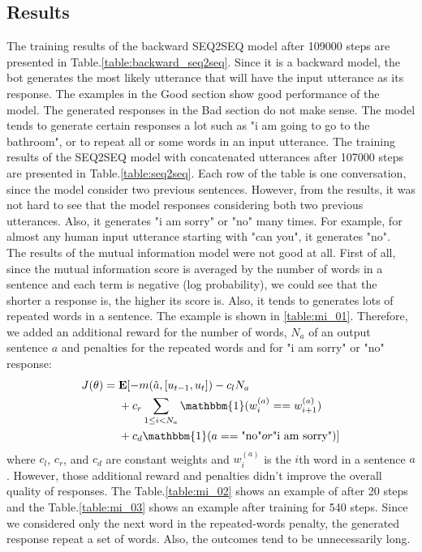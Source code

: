 \documentclass[letterpaper]{article}
\begin{document}
\subsection{Results}
The training results of the backward SEQ2SEQ model after 109000 steps are presented in Table.\ref{table:backward_seq2seq}. Since it is a backward model, the bot generates the most likely utterance that will have the input utterance as its response. The examples in the Good section show good performance of the model. The generated responses in the Bad section do not make sense. The model tends to generate certain responses a lot such as "i am going to go to the bathroom", or to repeat all or some words in an input utterance. The training results of the SEQ2SEQ model with concatenated utterances after 107000 steps are presented in Table.\ref{table:seq2seq}. Each row of the table is one conversation, since the model consider two previous sentences. However, from the results, it was not hard to see that the model responses considering both two previous utterances. Also, it generates "i am sorry" or "no" many times. For example, for almost any human input utterance starting with "can you", it generates "no". \\
The results of the mutual information model were not good at all. First of all, since the mutual information score is averaged by the number of words in a sentence and each term is negative (log probability), we could see that the shorter a response is, the higher its score is. Also, it tends to generates lots of repeated words in a sentence. The example is shown in \ref{table:mi_01}. Therefore, we added an additional reward for the number of words, $N_a$ of an output sentence $a$ and penalties for the repeated words and for "i am sorry" or "no" response:
\begin{align}
    J(\theta) =&\; \mathbf{E} [-m(\hat{a},[u_{t-1},u_t])-c_l N_a \nonumber \\
     &\; + c_r \sum_{1\leq i < N_a} \mathbbm{1}(w_i^{(a)} == w_{i+1}^{(a)}) \nonumber \\ 
     &\; +c_d \mathbbm{1}(a == \text{"no"} or \text{"i am sorry"})]
\end{align}
where $c_l$, $c_r$, and $c_d$ are constant weights and $w_i^{(a)}$ is the $i$th word in a sentence $a$. However, those additional reward and penalties didn't improve the overall quality of responses. The Table.\ref{table:mi_02} shows an example of after 20 steps and the Table.\ref{table:mi_03} shows an example after training for 540 steps. Since we considered only the next word in the repeated-words penalty, the generated response repeat a set of words. Also, the outcomes tend to be unnecessarily long.
\end{document}
